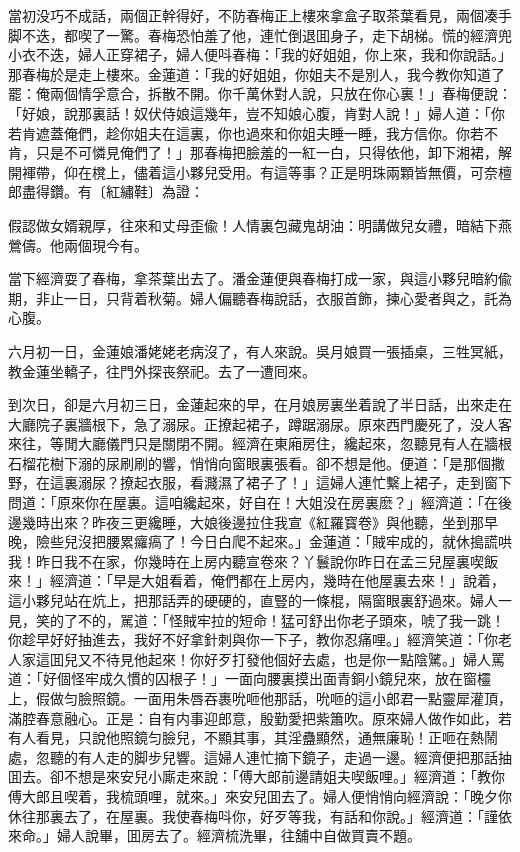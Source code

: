 當初没巧不成話，兩個正幹得好，不防春梅正上樓來拿盒子取茶葉看見，兩個凑手脚不迭，都喫了一驚。春梅恐怕羞了他，連忙倒退囬身子，走下胡梯。慌的經濟兜小衣不迭，婦人正穿裙子，婦人便呌春梅：「我的好姐姐，你上來，我和你說話。」那春梅於是走上樓來。金蓮道：「我的好姐姐，你姐夫不是別人，我今教你知道了罷：俺兩個情孚意合，拆散不開。你千萬休對人說，只放在你心裏！」春梅便說：「好娘，說那裏話！奴伏侍娘這幾年，豈不知娘心腹，肯對人說！」婦人道：「你若肯遮蓋俺們，趁你姐夫在這裏，你也過來和你姐夫睡一睡，我方信你。你若不肯，只是不可憐見俺們了！」那春梅把臉羞的一紅一白，只得依他，卸下湘裙，解開褌帶，仰在櫈上，儘着這小夥兒受用。有這等事？正是明珠兩顆皆無價，可奈檀郎盡得鑽。有〔紅繡鞋〕為證：

\begin{myquote}
假認做女婿親厚，往來和丈母歪偸！人情裏包藏鬼胡油：明講做兒女禮，暗結下燕鶯儔。他兩個現今有。
\end{myquote}

當下經濟耍了春梅，拿茶葉出去了。潘金蓮便與春梅打成一家，與這小夥兒暗約偸期，非止一日，只背着秋菊。婦人偏聽春梅說話，衣服首飾，揀心愛者與之，託為心腹。

六月初一日，金蓮娘潘姥姥老病沒了，有人來說。吳月娘買一張插桌，三牲冥紙，教金蓮坐轎子，往門外探丧祭祀。去了一遭囘來。

到次日，卻是六月初三日，金蓮起來的早，在月娘房裏坐着說了半日話，出來走在大廳院子裏牆根下，急了溺尿。正撩起裙子，蹲踞溺尿。原來西門慶死了，没人客來往，等閒大廳儀門只是關閉不開。經濟在東廂房住，纔起來，忽聽見有人在牆根石榴花樹下溺的尿刷刷的響，悄悄向窗眼裏張看。卻不想是他。便道：「是那個撒野，在這裏溺尿？撩起衣服，看濺濕了裙子了！」這婦人連忙繫上裙子，走到窗下問道：「原來你在屋裏。這咱纔起來，好自在！大姐没在房裏麽？」經濟道：「在後邊幾時出來？昨夜三更纔睡，大娘後邊拉住我宣《紅羅寳卷》與他聽，坐到那早晚，險些兒沒把腰累㿚瘑了！今日白爬不起來。」金蓮道：「賊牢成的，就休搗謊哄我！昨日我不在家，你幾時在上房内聽宣卷來？丫鬟說你昨日在孟三兒屋裏喫飯來！」經濟道：「早是大姐看着，俺們都在上房内，幾時在他屋裏去來！」說着，這小夥兒站在炕上，把那話弄的硬硬的，直豎的一條棍，隔窗眼裏舒過來。婦人一見，笑的了不的，駡道：「怪賊牢拉的短命！猛可舒出你老子頭來，唬了我一跳！你趁早好好抽進去，我好不好拿針刺與你一下子，教你忍痛哩。」經濟笑道：「你老人家這囬兒又不待見他起來！你好歹打發他個好去處，也是你一點陰騭。」婦人罵道：「好個怪牢成久慣的囚根子！」一面向腰裏摸出面青銅小鏡兒來，放在窗欞上，假做匀臉照鏡。一面用朱唇吞裹吮咂他那話，吮咂的這小郎君一點靈犀灌頂，滿腔春意融心。正是：自有内事迎郎意，殷勤愛把紫簫吹。原來婦人做作如此，若有人看見，只說他照鏡匀臉兒，不顯其事，其淫蠱顯然，通無廉恥！正咂在熱鬧處，忽聽的有人走的脚步兒響。這婦人連忙摘下鏡子，走過一邊。經濟便把那話抽囬去。卻不想是來安兒小廝走來說：「傅大郎前邊請姐夫喫飯哩。」經濟道：「教你傅大郎且喫着，我梳頭哩，就來。」來安兒囬去了。婦人便悄悄向經濟說：「晚夕你休往那裏去了，在屋裏。我使春梅呌你，好歹等我，有話和你說。」經濟道：「謹依來命。」婦人說畢，囬房去了。經濟梳洗畢，往舖中自做買賣不題。

